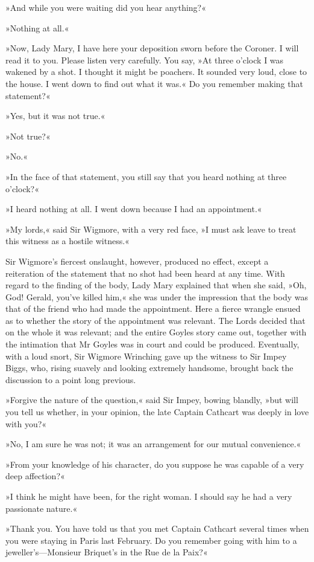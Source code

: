 »And while you were waiting did you hear anything?«

»Nothing at all.«

»Now, Lady Mary, I have here your deposition sworn before the Coroner.  I will read it to you. Please listen very carefully. You say, »At three o'clock I was wakened by a shot. I thought it might be poachers. It sounded very loud, close to the house. I went down to find out what it was.« Do you remember making that statement?«

»Yes, but it was not true.«

»Not true?«

»No.«

»In the face of that statement, you still say that you heard nothing at three o'clock?«

»I heard nothing at all. I went down because I had an appointment.«

»My lords,« said Sir Wigmore, with a very red face, »I must ask leave to treat this witness as a hostile witness.«

Sir Wigmore's fiercest onslaught, however, produced no effect, except a reiteration of the statement that no shot had been heard at any time. With regard to the finding of the body, Lady Mary explained that when she said, »Oh, God! Gerald, you've killed him,« she was under the impression that the body was that of the friend who had made the appointment. Here a fierce wrangle ensued as to whether the story of the appointment was relevant. The Lords decided that on the whole it was relevant; and the entire Goyles story came out, together with the intimation that Mr Goyles was in court and could be produced.  Eventually, with a loud snort, Sir Wigmore Wrinching gave up the witness to Sir Impey Biggs, who, rising suavely and looking extremely handsome, brought back the discussion to a point long previous.

»Forgive the nature of the question,« said Sir Impey, bowing blandly, »but will you tell us whether, in your opinion, the late Captain Cathcart was deeply in love with you?«

»No, I am sure he was not; it was an arrangement for our mutual convenience.«

»From your knowledge of his character, do you suppose he was capable of a very deep affection?«

»I think he might have been, for the right woman. I should say he had a very passionate nature.«

»Thank you. You have told us that you met Captain Cathcart several times when you were staying in Paris last February. Do you remember going with him to a jeweller's\allowbreak---\allowbreak Monsieur Briquet's in the Rue de la Paix?«


